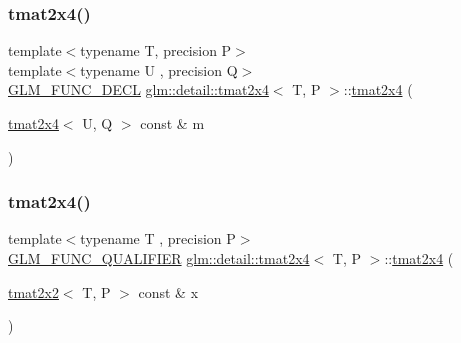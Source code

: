 \mbox{\label{structglm_1_1detail_1_1tmat2x4_a112e455f02edb2c42ef8c0ad72495a4e}} 
\subsubsection{\texorpdfstring{tmat2x4()}{tmat2x4()}\hspace{0.1cm}{\footnotesize\ttfamily [10/22]}}
{\footnotesize\ttfamily template$<$typename T, precision P$>$ \\
template$<$typename U , precision Q$>$ \\
\hyperlink{setup_8hpp_ab2d052de21a70539923e9bcbf6e83a51}{G\+L\+M\+\_\+\+F\+U\+N\+C\+\_\+\+D\+E\+CL} \hyperlink{structglm_1_1detail_1_1tmat2x4}{glm\+::detail\+::tmat2x4}$<$ T, P $>$\+::\hyperlink{structglm_1_1detail_1_1tmat2x4}{tmat2x4} (\begin{DoxyParamCaption}\item[{\hyperlink{structglm_1_1detail_1_1tmat2x4}{tmat2x4}$<$ U, Q $>$ const \&}]{m }\end{DoxyParamCaption})\hspace{0.3cm}{\ttfamily [explicit]}}

\mbox{\label{structglm_1_1detail_1_1tmat2x4_aef916b6a3c4b7957458c9b7bc5895841}} 
\subsubsection{\texorpdfstring{tmat2x4()}{tmat2x4()}\hspace{0.1cm}{\footnotesize\ttfamily [11/22]}}
{\footnotesize\ttfamily template$<$typename T , precision P$>$ \\
\hyperlink{setup_8hpp_a33fdea6f91c5f834105f7415e2a64407}{G\+L\+M\+\_\+\+F\+U\+N\+C\+\_\+\+Q\+U\+A\+L\+I\+F\+I\+ER} \hyperlink{structglm_1_1detail_1_1tmat2x4}{glm\+::detail\+::tmat2x4}$<$ T, P $>$\+::\hyperlink{structglm_1_1detail_1_1tmat2x4}{tmat2x4} (\begin{DoxyParamCaption}\item[{\hyperlink{structglm_1_1detail_1_1tmat2x2}{tmat2x2}$<$ T, P $>$ const \&}]{x }\end{DoxyParamCaption})\hspace{0.3cm}{\ttfamily [explicit]}}



